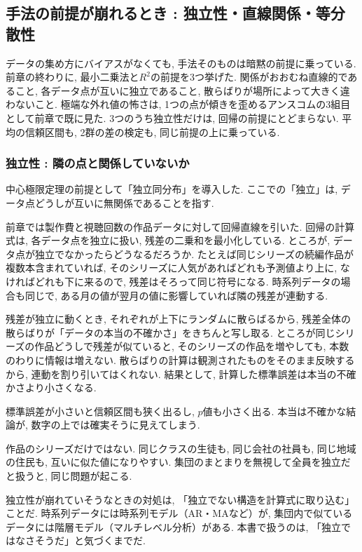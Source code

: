 \subsection{手法の前提が崩れるとき : 独立性・直線関係・等分散性}

データの集め方にバイアスがなくても, 手法そのものは暗黙の前提に乗っている.
前章の終わりに, 最小二乗法と$R^2$の前提を3つ挙げた. 関係がおおむね直線的であること, 各データ点が互いに独立であること, 散らばりが場所によって大きく違わないこと.
極端な外れ値の怖さは, 1つの点が傾きを歪めるアンスコムの3組目として前章で既に見た.
3つのうち独立性だけは, 回帰の前提にとどまらない.
平均の信頼区間も, 2群の差の検定も, 同じ前提の上に乗っている.

\subsubsection*{独立性 : 隣の点と関係していないか}

中心極限定理の前提として「独立同分布」を導入した.
ここでの「独立」は, データ点どうしが互いに無関係であることを指す.

前章では製作費と視聴回数の作品データに対して回帰直線を引いた.
回帰の計算式は, 各データ点を独立に扱い, 残差の二乗和を最小化している.
ところが, データ点が独立でなかったらどうなるだろうか.
たとえば同じシリーズの続編作品が複数本含まれていれば, そのシリーズに人気があればどれも予測値より上に, なければどれも下に来るので, 残差はそろって同じ符号になる.
時系列データの場合も同じで, ある月の値が翌月の値に影響していれば隣の残差が連動する.

残差が独立に動くとき, それぞれが上下にランダムに散らばるから, 残差全体の散らばりが「データの本当の不確かさ」をきちんと写し取る.
ところが同じシリーズの作品どうしで残差が似ていると, そのシリーズの作品を増やしても, 本数のわりに情報は増えない.
散らばりの計算は観測されたものをそのまま反映するから, 連動を割り引いてはくれない.
結果として, 計算した標準誤差は本当の不確かさより小さくなる.

標準誤差が小さいと信頼区間も狭く出るし, $p$値も小さく出る.
本当は不確かな結論が, 数字の上では確実そうに見えてしまう.

作品のシリーズだけではない.
同じクラスの生徒も, 同じ会社の社員も, 同じ地域の住民も, 互いに似た値になりやすい.
集団のまとまりを無視して全員を独立だと扱うと, 同じ問題が起こる.

独立性が崩れていそうなときの対処は, 「独立でない構造を計算式に取り込む」ことだ.
時系列データには時系列モデル（AR・MAなど）が, 集団内で似ているデータには階層モデル（マルチレベル分析）がある.
本書で扱うのは, 「独立ではなさそうだ」と気づくまでだ.

